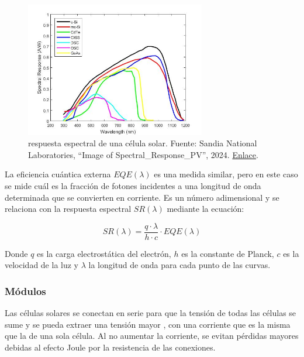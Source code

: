 \begin{figure}[H]
      \centering
      \includegraphics[width=0.7\textwidth]{./images/SoA_irrad/Spectral_Response_PV.jpg}
      \caption{\Gls{respuesta espectral} de una \gls{célula solar}. Fuente: Sandia National Laboratories, ``Image of Spectral\_Response\_PV'', 2024. \href{https://pvpmc.sandia.gov/modeling-guide/2-dc-module-iv/effective-irradiance/spectral-response/}{Enlace}.}
      \label{fig:spectral_response}
\end{figure}

La \gls{eficiencia cuántica externa} $EQE(\lambda)$ es una medida similar, pero en este caso se mide cuál es la fracción de fotones incidentes a una \gls{longitud de onda} determinada que se convierten en corriente. Es un número adimensional y se relaciona con la \gls{respuesta espectral} $SR(\lambda)$ mediante la ecuación:

\begin{equation} \label{eq:relacion_sr_eqe}
      SR(\lambda) = \frac{q \cdot \lambda}{h \cdot c} \cdot EQE(\lambda)
\end{equation}

Donde $q$ es la carga electrostática del electrón, $h$ es la constante de Planck, $c$ es la velocidad de la luz y $\lambda$ la \gls{longitud de onda} para cada punto de las curvas.

\subsubsection{Módulos}

Las células solares se conectan en serie para que la tensión de todas las células se sume y se pueda extraer una tensión mayor \cite{victoria2024fundamentals}, con una corriente que es la misma que la de una sola célula. Al no aumentar la corriente, se evitan pérdidas mayores debidas al \gls{efecto Joule} por la resistencia de las conexiones.

